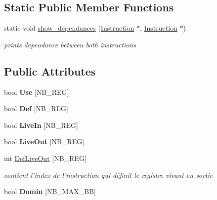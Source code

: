 \subsection*{Static Public Member Functions}
\begin{DoxyCompactItemize}
\item 
\hypertarget{class_basic__block_aef985f2438261d429f81c7b5d4de5f16}{static void \hyperlink{class_basic__block_aef985f2438261d429f81c7b5d4de5f16}{show\+\_\+dependances} (\hyperlink{class_instruction}{Instruction} $\ast$, \hyperlink{class_instruction}{Instruction} $\ast$)}\label{class_basic__block_aef985f2438261d429f81c7b5d4de5f16}

\begin{DoxyCompactList}\small\item\em prints dependance between both instructions \end{DoxyCompactList}\end{DoxyCompactItemize}
\subsection*{Public Attributes}
\begin{DoxyCompactItemize}
\item 
\hypertarget{class_basic__block_a1a8d751c01628f35095a35d575beb222}{bool {\bfseries Use} \mbox{[}N\+B\+\_\+\+R\+E\+G\mbox{]}}\label{class_basic__block_a1a8d751c01628f35095a35d575beb222}

\item 
\hypertarget{class_basic__block_ae46ec94a0bd08844638d70c145fd56ab}{bool {\bfseries Def} \mbox{[}N\+B\+\_\+\+R\+E\+G\mbox{]}}\label{class_basic__block_ae46ec94a0bd08844638d70c145fd56ab}

\item 
\hypertarget{class_basic__block_a41faa67e5761077c1d21749740400fcb}{bool {\bfseries Live\+In} \mbox{[}N\+B\+\_\+\+R\+E\+G\mbox{]}}\label{class_basic__block_a41faa67e5761077c1d21749740400fcb}

\item 
\hypertarget{class_basic__block_a38ae01a57bdeffc1a5e1fca510ba231a}{bool {\bfseries Live\+Out} \mbox{[}N\+B\+\_\+\+R\+E\+G\mbox{]}}\label{class_basic__block_a38ae01a57bdeffc1a5e1fca510ba231a}

\item 
\hypertarget{class_basic__block_ab8a10607e6603dba67f5055d53745421}{int \hyperlink{class_basic__block_ab8a10607e6603dba67f5055d53745421}{Def\+Live\+Out} \mbox{[}N\+B\+\_\+\+R\+E\+G\mbox{]}}\label{class_basic__block_ab8a10607e6603dba67f5055d53745421}

\begin{DoxyCompactList}\small\item\em contient l'index de l'instruction qui définit le registre vivant en sortie \end{DoxyCompactList}\item 
\hypertarget{class_basic__block_a03026db897e97c48ee99b85d4e62137f}{bool {\bfseries Domin} \mbox{[}N\+B\+\_\+\+M\+A\+X\+\_\+\+B\+B\mbox{]}}\label{class_basic__block_a03026db897e97c48ee99b85d4e62137f}

\end{DoxyCompactItemize}


